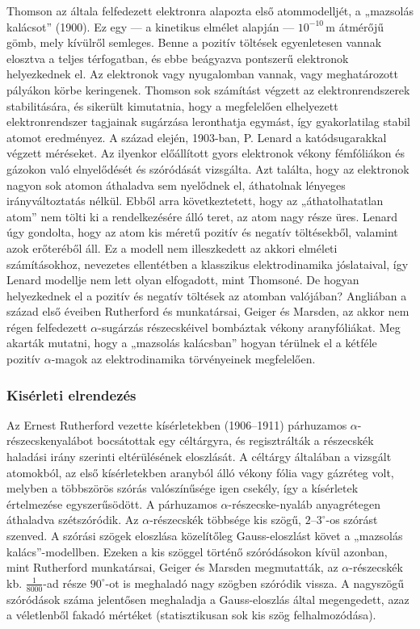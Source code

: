 \documentclass[a4paper,12pt]{article}
\begin{document}
Thomson az általa felfedezett elektronra alapozta első atommodelljét, a „mazsolás kalácsot” (1900). Ez egy — a kinetikus elmélet alapján — $10^{-10}\,\mathrm{m}$ átmérőjű gömb, mely kívülről semleges. Benne a pozitív töltések egyenletesen vannak elosztva a teljes térfogatban, és ebbe beágyazva pontszerű elektronok helyezkednek el.
Az elektronok vagy nyugalomban vannak, vagy meghatározott pályákon körbe keringenek. Thomson sok számítást végzett az elektronrendszerek stabilitására, és sikerült kimutatnia, hogy a megfelelően elhelyezett elektronrendszer tagjainak sugárzása leronthatja egymást, így gyakorlatilag stabil atomot eredményez. A század elején, 1903-ban, P. Lenard a katódsugarakkal végzett méréseket.
Az ilyenkor előállított gyors elektronok vékony fémfóliákon és gázokon való elnyelődését és szóródását vizsgálta. Azt találta, hogy az elektronok nagyon sok atomon áthaladva sem nyelődnek el, áthatolnak lényeges irányváltoztatás nélkül. Ebből arra következtetett, hogy az „áthatolhatatlan atom” nem tölti ki a rendelkezésére álló teret, az atom nagy része üres. Lenard úgy gondolta, hogy az atom kis méretű pozitív és negatív töltésekből, valamint azok erőteréből áll.
Ez a modell nem illeszkedett az akkori elméleti számításokhoz, nevezetes ellentétben a klasszikus elektrodinamika jóslataival, így Lenard modellje nem lett olyan elfogadott, mint Thomsoné. De hogyan helyezkednek el a pozitív és negatív töltések az atomban valójában? Angliában a század első éveiben Rutherford és munkatársai, Geiger és Marsden, az akkor nem régen felfedezett $\alpha$-sugárzás részecskéivel bombáztak vékony aranyfóliákat. Meg akarták mutatni, hogy a „mazsolás kalácsban” hogyan térülnek el a kétféle pozitív $\alpha$-magok az elektrodinamika törvényeinek megfelelően.

\subsubsection{Kisérleti elrendezés}
Az Ernest Rutherford vezette kísérletekben (1906--1911) párhuzamos
$\alpha$-részecskenyalábot bocsátottak egy céltárgyra, és regisztrálták
a részecskék haladási irány szerinti eltérülésének eloszlását.
A céltárgy általában a vizsgált atomokból, az első kísérletekben aranyból
álló vékony fólia vagy gázréteg volt, melyben a többszörös szórás
valószínűsége igen csekély, így a kísérletek értelmezése egyszerűsödött.
A párhuzamos $\alpha$-részecske-nyaláb anyagrétegen áthaladva
szétszóródik.
Az $\alpha$-részecskék többsége kis szögű, $2$--$3^\circ$-os szórást szenved.
A szórási szögek eloszlása közelítőleg Gauss-eloszlást követ a
„mazsolás kalács”-modellben.
Ezeken a kis szöggel történő szóródásokon kívül azonban, mint Rutherford
munkatársai, Geiger és Marsden megmutatták, az $\alpha$-részecskék kb.
$\tfrac{1}{8000}$-ad része $90^\circ$-ot is meghaladó nagy szögben
szóródik vissza.
A nagyszögű szóródások száma jelentősen meghaladja a Gauss-eloszlás
által megengedett, azaz a véletlenből fakadó mértéket
(statisztikusan sok kis szög felhalmozódása).
\end{document}
